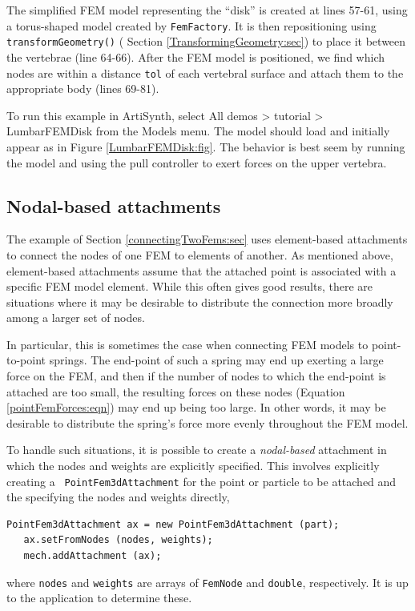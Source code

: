 The simplified FEM model representing the ``disk'' is created at lines
57-61, using a torus-shaped model created by {\tt FemFactory}.  It is
then repositioning using {\tt transformGeometry()} (
Section \ref{TransformingGeometry:sec}) to place it between the
vertebrae (line 64-66).  After the FEM model is positioned, we find
which nodes are within a distance {\tt tol} of each vertebral surface
and attach them to the appropriate body (lines 69-81).

To run this example in ArtiSynth, select {\sf All demos > tutorial >
LumbarFEMDisk} from the {\sf Models} menu. The model should load and
initially appear as in Figure \ref{LumbarFEMDisk:fig}.  The
behavior is best seem by running the model and using the pull
controller to exert forces on the upper vertebra.

\subsection{Nodal-based attachments}
\label{sec:fem:nodalAttachments}

The example of Section \ref{connectingTwoFems:sec} uses element-based
attachments to connect the nodes of one FEM to elements of another.
As mentioned above, element-based attachments assume that the attached
point is associated with a specific FEM model element. 
While this often gives good results, there are situations where it may
be desirable to distribute the connection more broadly among a larger
set of nodes. 

In particular, this is sometimes the case when connecting FEM models
to point-to-point springs. The end-point of such a spring may end up
exerting a large force on the FEM, and then if the number of nodes to
which the end-point is attached are too small, the resulting forces on
these nodes (Equation \ref{pointFemForces:eqn}) may end up being too
large. In other words, it may be desirable to distribute the spring's
force more evenly throughout the FEM model. 

To handle such situations, it is possible to create a {\it
nodal-based} attachment in which the nodes and weights are explicitly
specified. This involves explicitly creating a {\tt
PointFem3dAttachment} for the point or particle to be attached and the
specifying the nodes and weights directly,
%
\begin{lstlisting}[]
   PointFem3dAttachment ax = new PointFem3dAttachment (part);
   ax.setFromNodes (nodes, weights);
   mech.addAttachment (ax);
\end{lstlisting}
%
where {\tt nodes} and {\tt weights} are arrays of {\tt FemNode} and
{\tt double}, respectively. It is up to the application to determine
these.

